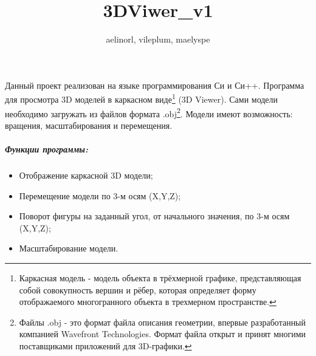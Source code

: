 \documentclass[a4paper,20pt]{article}
\author{aelinorl, vileplum, maelyspe}
\title{3DViwer\_v1}
\date{}
\begin{document}
	\maketitle
	Данный проект реализован на языке программирования Си и Си++. Программа для просмотра 3D моделей в каркасном виде\footnote{Каркасная модель - модель объекта в трёхмерной графике, представляющая собой совокупность вершин и рёбер, которая определяет форму отображаемого многогранного объекта в трехмерном пространстве.} (3D Viewer). Сами модели необходимо загружать из файлов формата .obj\footnote{Файлы .obj - это формат файла описания геометрии, впервые разработанный компанией Wavefront Technologies. Формат файла открыт и принят многими поставщиками приложений для 3D-графики.}. Модели имеют возможность: вращения, масштабирования и перемещения.
	\newpage
	
	\subparagraph{Функции программы:}
	\flushleft
	\begin{itemize}
		\item Отображение каркасной 3D модели;
		\item Перемещение модели по 3-м осям (X,Y,Z);
		\item Поворот фигуры на заданный угол, от начального значения, по 3-м осям (X,Y,Z);
		\item Масштабирование модели.
	\end{itemize}
	
\end{document}
